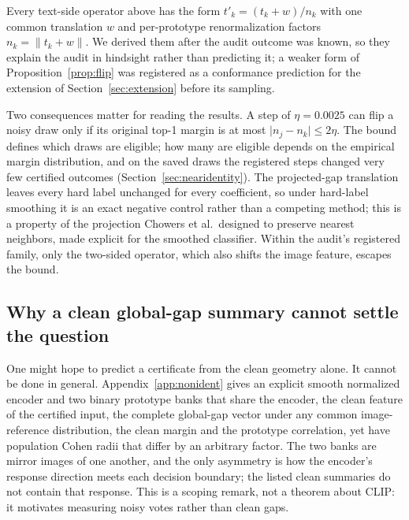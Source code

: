 Every text-side operator above has the form $t'_k=(t_k+w)/n_k$ with one common
translation $w$ and per-prototype renormalization factors
$n_k=\lVert t_k+w\rVert$. We derived
them after the audit outcome was known, so they explain the audit in hindsight
rather than predicting it; a weaker form of Proposition~\ref{prop:flip} was
registered as a conformance prediction for the extension of
Section~\ref{sec:extension} before its sampling.



Two consequences matter for reading the results. A step of $\eta=0.0025$ can
flip a noisy draw only if its original top-1 margin is at most
$\lvert n_j-n_k\rvert\le2\eta$. The bound defines which draws are eligible;
how many are eligible depends on the empirical margin distribution, and on the
saved draws the registered steps changed very few certified outcomes
(Section~\ref{sec:nearidentity}). The projected-gap
translation leaves every hard label unchanged for every coefficient, so under
hard-label smoothing it is an exact negative control rather than a competing
method; this is a property of the projection Chowers et al.\ designed to
preserve nearest neighbors, made explicit for the smoothed classifier. Within
the audit's registered family, only the two-sided operator, which also shifts
the image feature, escapes the bound.

\subsection{Why a clean global-gap summary cannot settle the question}
\label{sec:nonident}

One might hope to predict a certificate from the clean geometry alone. It cannot
be done in general. Appendix~\ref{app:nonident} gives an explicit smooth
normalized encoder and two binary prototype banks that share the encoder, the
clean feature of the certified input, the complete global-gap vector under any
common image-reference distribution, the clean margin and the prototype
correlation, yet have population Cohen radii that differ by an arbitrary factor.
The two banks are mirror images of one another, and the only asymmetry is how
the encoder's response direction meets each decision boundary; the listed clean
summaries do not contain that response. This is a scoping remark, not a theorem about
CLIP: it motivates measuring noisy votes rather than clean gaps.
